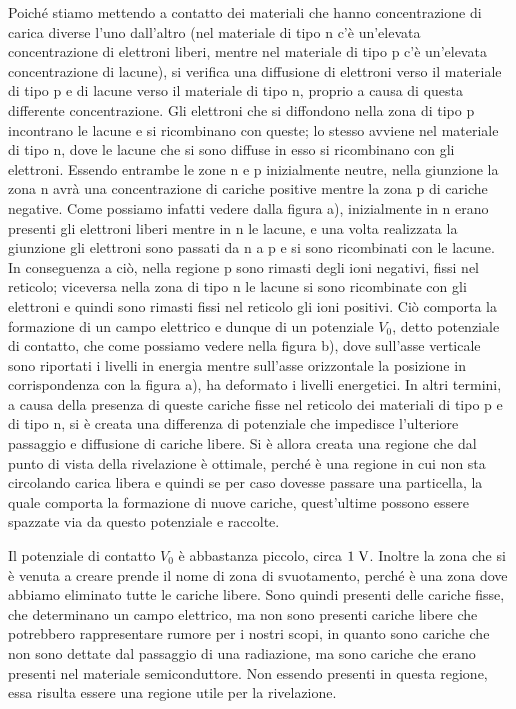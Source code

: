 Poiché stiamo mettendo a contatto dei materiali che hanno concentrazione di carica diverse l'uno dall'altro (nel materiale di tipo n c'è un'elevata concentrazione di elettroni liberi, mentre nel materiale di tipo p c'è un'elevata concentrazione di lacune), si verifica una diffusione di elettroni verso il materiale di tipo p e di lacune verso il materiale di tipo n, proprio a causa di questa differente concentrazione. Gli elettroni che si diffondono nella zona di tipo p incontrano le lacune e si ricombinano con queste; lo stesso avviene nel materiale di tipo n, dove le lacune che si sono diffuse in esso si ricombinano con gli elettroni. Essendo entrambe le zone n e p inizialmente neutre, nella giunzione la zona n avrà una concentrazione di cariche positive mentre la zona p di cariche negative. Come possiamo infatti vedere dalla figura a), inizialmente in n erano presenti gli elettroni liberi mentre in n le lacune, e una volta realizzata la giunzione gli elettroni sono passati da n a p e si sono ricombinati con le lacune. In conseguenza a ciò, nella regione p sono rimasti degli ioni negativi, fissi nel reticolo; viceversa nella zona di tipo n le lacune si sono ricombinate con gli elettroni e quindi sono rimasti fissi nel reticolo gli ioni positivi. Ciò comporta la formazione di un campo elettrico e dunque di un potenziale $V_0$, detto potenziale di contatto, che come possiamo vedere nella figura b), dove sull'asse verticale sono riportati i livelli in energia mentre sull'asse orizzontale la posizione in corrispondenza con la figura a), ha deformato i livelli energetici. In altri termini, a causa della presenza di queste cariche fisse nel reticolo dei materiali di tipo p e di tipo n, si è creata una differenza di potenziale che impedisce l'ulteriore passaggio e diffusione di cariche libere. Si è allora creata una regione che dal punto di vista della rivelazione è ottimale, perché è una regione in cui non sta circolando carica libera e quindi se per caso dovesse passare una particella, la quale comporta la formazione di nuove cariche, quest'ultime possono essere spazzate via da questo potenziale e raccolte.

Il potenziale di contatto $V_0$ è abbastanza piccolo, circa $1 \; \rm V$. Inoltre la zona che si è venuta a creare prende il nome di zona di svuotamento, perché è una zona dove abbiamo eliminato tutte le cariche libere. Sono quindi presenti delle cariche fisse, che determinano un campo elettrico, ma non sono presenti cariche libere che potrebbero rappresentare rumore per i nostri scopi, in quanto sono cariche che non sono dettate dal passaggio di una radiazione, ma sono cariche che erano presenti nel materiale semiconduttore. Non essendo presenti in questa regione, essa risulta essere una regione utile per la rivelazione.

